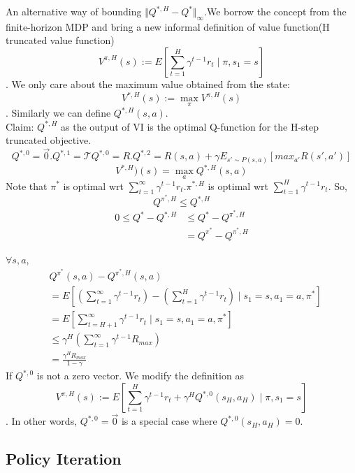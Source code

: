 \documentclass{report}
\begin{document}
An alternative way of bounding $\Vert Q^{*, H}-Q^{*}\Vert_{\infty}$.We borrow the concept from the finite-horizon MDP and bring a new informal definition of value function(H truncated value function)\[ V^{\pi, H}(s) := E[\sum_{t=1}^{H}\gamma^{t-1}r_t \mid \pi, s_1=s]\]. We only care about the maximum value obtained from the state: \[ V^{*, H}(s) := \max_{\pi}V^{\pi, H}(s)\]. Similarly we can define $Q^{*,H}(s,a)$.\\ 
Claim: $Q^{*,H}$ as the output of VI is the optimal Q-function for the H-step truncated objective.\[Q^{*,0}=\Vec{0}. Q^{*,1}=\mathcal{T}Q^{*,0}=R. Q^{*,2}=R(s,a)+\gamma E_{s'\sim P(s,a)}[max_{a'}R(s',a')]\]
\[V^{*,H})(s)=\max_{a}Q^{*,H}(s,a)\]
Note that $\pi^*$ is optimal wrt $\sum_{t=1}^{\infty}\gamma^{t-1}r_t$.$\pi^{*,H}$ is optimal wrt $\sum_{t=1}^{H}\gamma^{t-1}r_t$. So, 
\[
Q^{\pi^*,H} \leq Q^{*,H}
\]
\begin{equation*}
\begin{split}
      0 \leq Q^*-Q^{*,H} &\leq Q^*-Q^{\pi^*,H} \\
    &= Q^{\pi^*}-Q^{\pi^*,H}   
\end{split}
\end{equation*}

$\forall s,a$, \begin{equation*}
    \begin{split}
        &Q^{\pi^*}(s,a)-Q^{\pi^*,H}(s,a) \\
        &= E[(\sum_{t=1}^{\infty}\gamma^{t-1}r_t)-(\sum_{t=1}^{H}\gamma^{t-1}r_t)\mid s_1=s,a_1=a,\pi^*] \\
        &=E[\sum_{t=H+1}^{\infty}\gamma^{t-1}r_t \mid s_1=s,a_1=a,\pi^*]\\
        &\leq \gamma^H(\sum_{t=1}^{\infty} \gamma^{t-1}R_{max}) \\
        &=\frac{\gamma^H R_{max}}{1-\gamma}
    \end{split}
\end{equation*}
If $Q^{*,0}$ is not a zero vector. We modify the definition as \[ V^{\pi, H}(s) := E[\sum_{t=1}^{H}\gamma^{t-1}r_t+\gamma^{H}Q^{*,0}(s_H,a_H) \mid \pi, s_1=s]\]. In other words, $Q^{*,0}=\Vec{0}$ is a special case where $Q^{*,0}(s_H,a_H)=0$.
\subsection{Policy Iteration}
\end{document}
